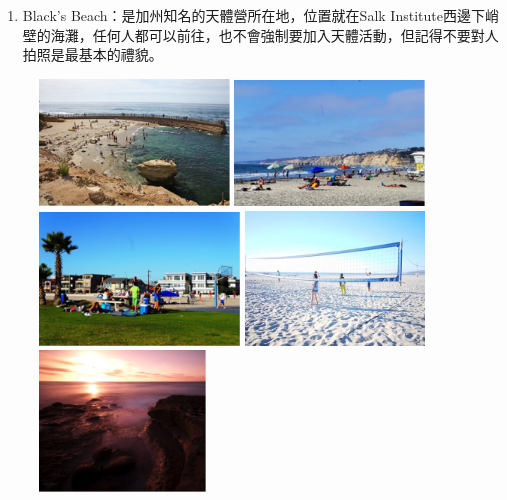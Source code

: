 \documentclass[10pt,a4paper]{book}
\begin{document}
\begin{CJK}{UTF8}{bkai}
\begin{enumerate}
\item Black's Beach：是加州知名的天體營所在地，位置就在Salk Institute西邊下峭壁的海灘，任何人都可以前往，也不會強制要加入天體活動，但記得不要對人拍照是最基本的禮貌。
\end{enumerate}

\begin{figure}[H]
\centering
\includegraphics[width=0.45\textwidth]{Pics/la_jolla_cove}
\includegraphics[width=0.45\textwidth]{Pics/la_jolla_shore}\\
\includegraphics[width=0.475\textwidth]{Pics/mission_bay}
\includegraphics[width=0.425\textwidth]{Pics/missionbay}\\
\includegraphics[width=0.395\textwidth]{Pics/sunset_cliff}

\end{figure}
\end{CJK}
\end{document}
